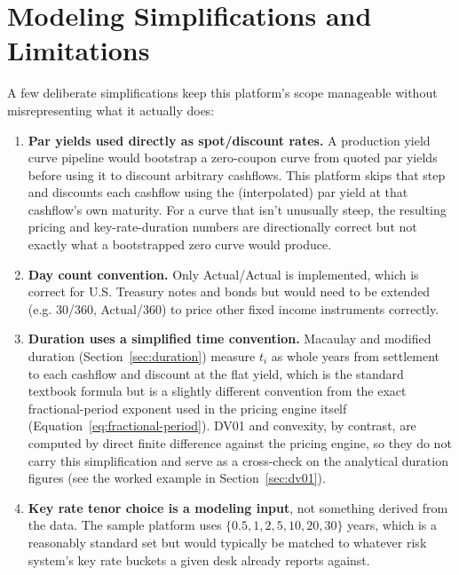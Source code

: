 \documentclass[11pt]{article}
\begin{document}
\section{Modeling Simplifications and Limitations}
\label{sec:curve-note}

A few deliberate simplifications keep this platform's scope manageable without misrepresenting
what it actually does:

\begin{enumerate}
  \item \textbf{Par yields used directly as spot/discount rates.} A production yield curve
        pipeline would bootstrap a zero-coupon curve from quoted par yields before using it to
        discount arbitrary cashflows. This platform skips that step and discounts each
        cashflow using the (interpolated) par yield at that cashflow's own maturity. For a
        curve that isn't unusually steep, the resulting pricing and key-rate-duration numbers
        are directionally correct but not exactly what a bootstrapped zero curve would produce.
  \item \textbf{Day count convention.} Only Actual/Actual is implemented, which is correct for
        U.S. Treasury notes and bonds but would need to be extended (e.g. 30/360,
        Actual/360) to price other fixed income instruments correctly.
  \item \textbf{Duration uses a simplified time convention.} Macaulay and modified duration
        (Section~\ref{sec:duration}) measure $t_i$ as whole years from settlement to each
        cashflow and discount at the flat yield, which is the standard textbook formula but is
        a slightly different convention from the exact fractional-period exponent used in the
        pricing engine itself (Equation~\ref{eq:fractional-period}). DV01 and convexity, by
        contrast, are computed by direct finite difference against the pricing engine, so they
        do not carry this simplification and serve as a cross-check on the analytical duration
        figures (see the worked example in Section~\ref{sec:dv01}).
  \item \textbf{Key rate tenor choice is a modeling input}, not something derived from the data.
        The sample platform uses $\{0.5, 1, 2, 5, 10, 20, 30\}$ years, which is a reasonably
        standard set but would typically be matched to whatever risk system's key rate buckets
        a given desk already reports against.
\end{enumerate}
\end{document}
